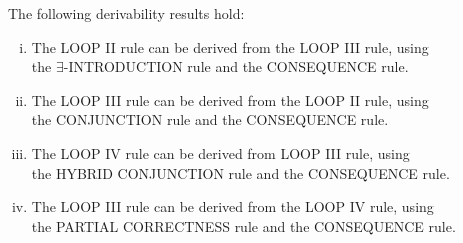 \documentclass[runningheads]{llncs}       %
\begin{document}
\begin{lemma}[Derivability] \label{lem:derivability}
The following derivability results hold:

\begin{enumerate} [(i)]
   \item The {\rm LOOP II} rule can be derived from the {\rm LOOP III} rule, using \\
   the  $\exists$-{\rm INTRODUCTION} rule and the {\rm CONSEQUENCE} rule.
   
    \vspace{2mm}

   \item The {\rm LOOP III} rule can be derived from the {\rm LOOP II} rule, using \\
   the {\rm CONJUNCTION} rule and the {\rm CONSEQUENCE} rule.
   
    \vspace{2mm}

   \item The {\rm LOOP IV} rule can be derived from {\rm LOOP III} rule, using \\
   the  {\rm HYBRID CONJUNCTION} rule and the {\rm CONSEQUENCE} rule.
   
    \vspace{2mm}

   \item The {\rm LOOP III} rule can be derived from the {\rm LOOP IV} rule, using \\
   the {\rm PARTIAL CORRECTNESS} rule and the {\rm CONSEQUENCE} rule.
   

   

   
\end{enumerate}

\end{lemma}
\end{document}
